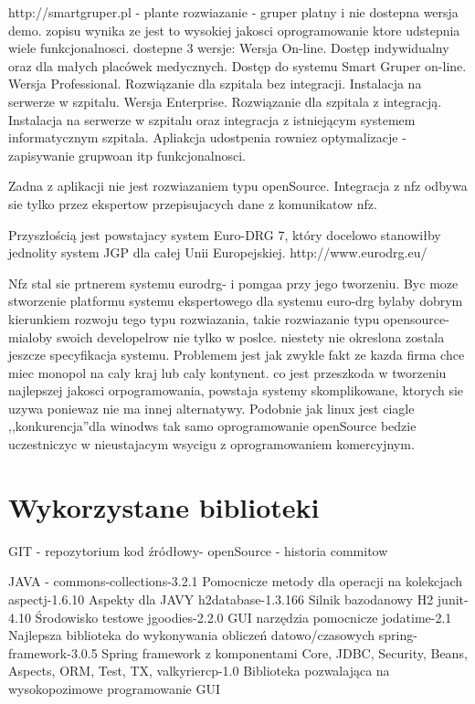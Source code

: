 http://smartgruper.pl - plante rozwiazanie - gruper platny i nie dostepna wersja demo. zopisu wynika ze jest to wysokiej jakosci oprogramowanie ktore udstepnia wiele funkcjonalnosci. dostepne 3 wersje:
Wersja On-line. Dostęp indywidualny oraz dla małych placówek medycznych. Dostęp do systemu Smart Gruper on-line.
Wersja Professional. Rozwiązanie dla szpitala bez integracji. Instalacja na serwerze w szpitalu.
Wersja Enterprise. Rozwiązanie dla szpitala z integracją. Instalacja na serwerze w szpitalu oraz integracja z istniejącym systemem informatycznym szpitala. Apliakcja udostpenia rowniez optymalizacje - zapisywanie grupwoan itp funkcjonalnosci.

Zadna z aplikacji nie jest rozwiazaniem typu openSource. Integracja z nfz odbywa sie tylko przez ekspertow przepisujacych dane z komunikatow nfz. 

Przyszłością jest powstajacy system Euro-DRG 7, który docelowo stanowiłby jednolity system JGP dla całej Unii Europejskiej.
http://www.eurodrg.eu/

Nfz stal sie prtnerem systemu eurodrg- i pomgaa przy jego tworzeniu. Byc moze stworzenie platformu systemu ekspertowego dla systemu euro-drg bylaby dobrym kierunkiem rozwoju tego typu rozwiazania, takie rozwiazanie typu opensource- mialoby swoich developelrow nie tylko w poslce. niestety nie okreslona zostala jeszcze specyfikacja systemu. Problemem jest jak zwykle fakt ze kazda firma chce miec monopol na caly kraj lub caly kontynent. co jest przeszkoda w tworzeniu najlepszej jakosci orpogramowania, powstaja systemy skomplikowane, ktorych sie uzywa poniewaz nie ma innej alternatywy. Podobnie jak linux jest ciagle ,,konkurencja''dla winodws tak samo oprogramowanie openSource bedzie uczestniczyc w nieustajacym wsycigu z oprogramowaniem komercyjnym. 


\section{Wykorzystane biblioteki}
\label{sec:wykorzystaneBiblioteki}
GIT - repozytorium kod źródłowy- openSource - historia commitow

JAVA -
commons-collections-3.2.1	Pomocnicze metody dla operacji na kolekcjach
aspectj-1.6.10			Aspekty dla JAVY
h2database-1.3.166		Silnik bazodanowy H2
junit-4.10			Środowisko testowe
jgoodies-2.2.0 			GUI narzędzia pomocnicze
jodatime-2.1			Najlepsza biblioteka do wykonywania obliczeń datowo/czasowych 
spring-framework-3.0.5		Spring framework z komponentami Core, JDBC, Security, Beans, Aspects, ORM, Test, TX, 
valkyriercp-1.0			Biblioteka pozwalająca na wysokopozimowe programowanie GUI

